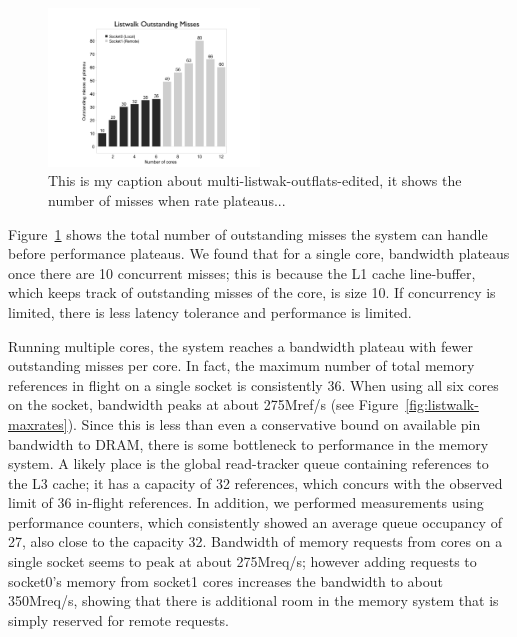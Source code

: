 \begin{figure}[h]
	\begin{center}
		\includegraphics[width=0.5\textwidth]{figures/multi-listwalk-outflats-edited.pdf}
	\end{center}
	\caption{This is my caption about multi-listwak-outflats-edited, it shows the number of misses when rate plateaus...}
	\label{fig:listwalk-outflats}
\end{figure}

	 Figure~\ref{fig:listwalk-outflats} shows the total number of outstanding misses the system can handle before performance plateaus. We found that for a single core, bandwidth plateaus once there are 10 concurrent misses; this is because the L1 cache line-buffer, which keeps track of outstanding misses of the core, is size 10. If concurrency is limited, there is less latency tolerance and performance is limited. 

	Running multiple cores, the system reaches a bandwidth plateau with fewer outstanding misses per core. In fact, the maximum number of total memory references in flight on a single socket is consistently 36. When using all six cores on the socket, bandwidth peaks at about 275Mref/s (see Figure~\ref{fig:listwalk-maxrates}). Since this is less than even a conservative bound on available pin bandwidth to DRAM, there is some bottleneck to performance in the memory system. A likely place is the global read-tracker queue containing references to the L3 cache; it has a capacity of 32 references, which concurs with the observed limit of 36 in-flight references. In addition, we performed measurements using performance counters, which consistently showed an average queue occupancy of 27, also close to the capacity 32.
   
	Bandwidth of memory requests from cores on a single socket seems to peak at about 275Mreq/s; however adding requests to socket0's memory from socket1 cores increases the bandwidth to about 350Mreq/s, showing that there is additional room in the memory system that is simply reserved for remote requests.

